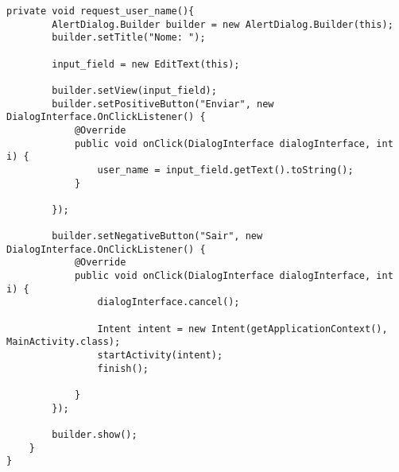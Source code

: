 \documentclass[12pt,a4paper]{article}
\begin{document}
\begin{lstlisting}[caption=./mobile/src/main/java/app/transparenciaeducativa/ChatRealTimeActivity.java]
    private void request_user_name(){
        AlertDialog.Builder builder = new AlertDialog.Builder(this);
        builder.setTitle("Nome: ");

        input_field = new EditText(this);

        builder.setView(input_field);
        builder.setPositiveButton("Enviar", new DialogInterface.OnClickListener() {
            @Override
            public void onClick(DialogInterface dialogInterface, int i) {
                user_name = input_field.getText().toString();
            }

        });

        builder.setNegativeButton("Sair", new DialogInterface.OnClickListener() {
            @Override
            public void onClick(DialogInterface dialogInterface, int i) {
                dialogInterface.cancel();

                Intent intent = new Intent(getApplicationContext(), MainActivity.class);
                startActivity(intent);
                finish();

            }
        });

        builder.show();
    }
}
\end{lstlisting}
\pagebreak
\end{document}
